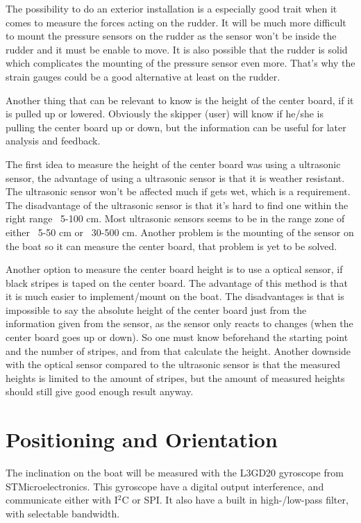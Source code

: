 ﻿\documentclass{article}
\begin{document}
The possibility to do an exterior installation is a especially good trait when it comes to measure the forces acting on the rudder. It will be much more difficult to mount the pressure sensors on the rudder as the sensor won't be inside the rudder and it must be enable to move. It is also possible that the rudder is solid which complicates the mounting of the pressure sensor even more. That's why the strain gauges could be a good alternative at least on the rudder.

Another thing that can be relevant to know is the height of the center board, if it is pulled up or lowered. Obviously the skipper (user) will know if he/she is pulling the center board up or down, but the information can be useful for later analysis and feedback. 

The first idea to measure the height of the center board was using a ultrasonic sensor, the advantage of using a ultrasonic sensor is that it is weather resistant. The ultrasonic sensor won't be affected much if gets wet, which is a requirement. The disadvantage of the ultrasonic sensor is that it's hard to find one within the right range ~5-100 cm. Most ultrasonic sensors seems to be in the range zone of either ~5-50 cm or ~30-500 cm. Another problem is the mounting of the sensor on the boat so it can measure the center board, that problem is yet to be solved.

Another option to measure the center board height is to use a optical sensor, if black stripes is taped on the center board. The advantage of this method is that it is much easier to implement/mount on the boat. The disadvantages is that is impossible to say the absolute height of the center board just from the information given from the sensor, as the sensor only reacts to changes (when the center board goes up or down). So one must know beforehand the starting point and the number of stripes, and from that calculate the height. Another downside with the optical sensor compared to the ultrasonic sensor is that the measured heights is limited to the amount of stripes, but the amount of measured heights should still give good enough result anyway.     



\section{Positioning and Orientation} 
The inclination on the boat will be measured with the L3GD20 gyroscope from STMicroelectronics. This gyroscope have a digital output interference, and communicate either with I$^2$C or SPI. It also have a built in high-/low-pass filter, with selectable bandwidth.
\end{document}
